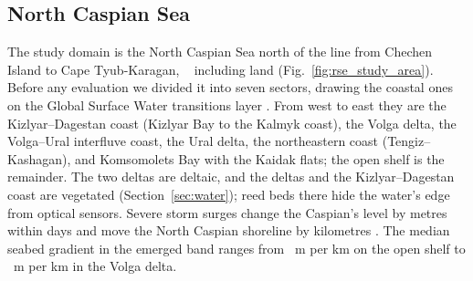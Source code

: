 
\subsection{North Caspian Sea}
\label{sec:nc}
The study domain is the North Caspian Sea north of the line from Chechen Island to Cape Tyub-Karagan, ~\kmsq{} including land (Fig.~\ref{fig:rse_study_area}). Before any evaluation we divided it into seven sectors, drawing the coastal ones on the Global Surface Water transitions layer \citep{pekel2016}. From west to east they are the Kizlyar--Dagestan coast (Kizlyar Bay to the Kalmyk coast), the Volga delta, the Volga--Ural interfluve coast, the Ural delta, the northeastern coast (Tengiz--Kashagan), and Komsomolets Bay with the Kaidak flats; the open shelf is the remainder. The two deltas are deltaic, and the deltas and the Kizlyar--Dagestan coast are vegetated (Section~\ref{sec:water}); reed beds there hide the water's edge from optical sensors.  Severe storm surges change the Caspian's level by metres within days \citep{lahijani2023} and move the North Caspian shoreline by kilometres \citep{pavlova2020,yeltay2026}. The median seabed gradient in the emerged band ranges from ~m per km on the open shelf to ~m per km in the Volga delta. 



